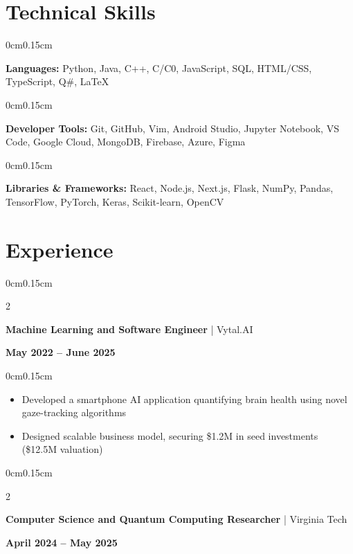 \documentclass[10pt, letterpaper]{article}
\newenvironment{highlights}{
    \begin{itemize}[topsep=0pt, parsep=0pt, partopsep=0pt, itemsep=0pt, leftmargin=0.6cm]
}{
    \end{itemize}
}
\newenvironment{onecolentry}{
    \begin{adjustwidth}{0cm}{0.15cm}
}{
    \end{adjustwidth}
}
\newenvironment{twocolentry}[2][]{
    \onecolentry
    \def\secondColumn{#2}
    \setcolumnwidth{\fill, 4cm}
    \begin{paracol}{2}
}{
    \switchcolumn \raggedleft \secondColumn
    \end{paracol}
    \endonecolentry
}
\begin{document}
    \vspace{0.05cm}

    \section{Technical Skills}
    \vspace{0.05cm}

    \begin{onecolentry}
        \textbf{Languages:} Python, Java, C++, C/C0, JavaScript, SQL, HTML/CSS, TypeScript, Q\#, LaTeX
    \end{onecolentry}

    \begin{onecolentry}
        \textbf{Developer Tools:} Git, GitHub, Vim, Android Studio, Jupyter Notebook, VS Code, Google Cloud, MongoDB, Firebase, Azure, Figma
    \end{onecolentry}

    \begin{onecolentry}
        \textbf{Libraries \& Frameworks:} React, Node.js, Next.js, Flask, NumPy, Pandas, TensorFlow, PyTorch, Keras, Scikit-learn, OpenCV
    \end{onecolentry}

    \vspace{0.05cm}

    \section{Experience}
    \vspace{0.05cm}

    \begin{twocolentry}{\textbf{May 2022 -- June 2025}}
        \textbf{Machine Learning and Software Engineer} | Vytal.AI
    \end{twocolentry}

    \begin{onecolentry}
        \begin{highlights}
            \item Developed a smartphone AI application quantifying brain health using novel gaze-tracking algorithms
            \item Designed scalable business model, securing \$1.2M in seed investments (\$12.5M valuation)
        \end{highlights}
    \end{onecolentry}

    \vspace{0.05cm}
    \begin{twocolentry}{\textbf{April 2024 -- May 2025}}
        \textbf{Computer Science and Quantum Computing Researcher} | Virginia Tech
    \end{twocolentry}
\end{document}

